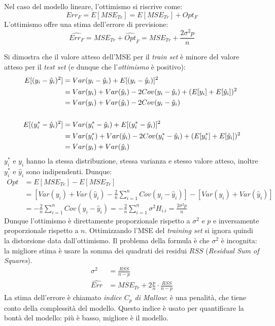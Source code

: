 \documentclass[12pt, a4page]{article}
\begin{document}
Nel caso del modello lineare, l'ottimismo si riscrive come:
\begin{equation*}
  Err_F = E[MSE_{Te}] = E[MSE_{Tr}] + Opt_F
\end{equation*}
L'ottimismo offre una stima dell'errore di previsione:
\begin{equation*}
  \hat{Err_F} = MSE_{Tr} + \hat{Opt}_F = MSE_{Tr} + \frac{2\sigma^2 p}{n}
\end{equation*}

Si dimostra che il valore atteso dell'MSE per il \textit{train set} è minore del valore atteso per il \textit{test set} (e dunque che l'\textit{ottimismo} è positivo):
\begin{align*}
  E[(y_i - \hat{y}_i)^2] &= Var(y_i - \hat{y}_i) + E[(y_i - \hat{y}_i)]^2 \\
                         &= Var(y_i) + Var(\hat{y}_i) - 2Cov(y_i - \hat{y}_i) + (E[y_i] + E[\hat{y}_i])^2 \\
  &= Var(y_i) + Var(\hat{y}_i) - 2Cov(y_i - \hat{y}_i) \\
  \vspace{5pt} \\
  E[(y_i^* - \hat{y}_i)^2] &= Var(y_i^* - \hat{y}_i) + E[(y_i^* - \hat{y}_i)]^2 \\
                         &= Var(y_i^*) + Var(\hat{y}_i) - 2Cov(y_i^* - \hat{y}_i) + (E[y_i^*] + E[\hat{y}_i])^2 \\
                         &= Var(y_i) + Var(\hat{y}_i)
\end{align*}
$y_i^*$ e $y_i$ hanno la stessa distribuzione, stessa varianza e stesso valore atteso, inoltre $y_i^*$ e $\hat{y}_i$ sono indipendenti.
Dunque:
\begin{align*}
  Opt &= E[MSE_{Te}] - E[MSE_{Tr}] \\
                         &= [Var(y_i) + Var(\hat{y}_i) - \frac{2}{n}\sum_{i=1}^n Cov(y_i - \hat{y}_i)] - [Var(y_i) + Var(\hat{y}_i)] \\
                         &= - \frac{2}{n}\sum_{i=1}^n Cov(y_i - \hat{y}_i)
                           = - \frac{2}{n}\sum_{i=1}^n \sigma^2H_{i.i}
                           = \frac{2\sigma^2 p}{n}
\end{align*}
Dunque l'ottimismo è direttamente proporzionale rispetto a $\sigma^2$ e $p$ e inversamente proporzionale rispetto a $n$.
Ottimizzando l'MSE del \textit{training set} si ignora quindi la distorsione data dall'ottimismo.
Il problema della formula è che $\sigma^2$ è incognita: la migliore stima è usare la somma dei quadrati dei residui $RSS$ (\textit{Residual Sum of Squares}).
\begin{align*}
  \sigma^2 &= \frac{RSS}{n - p} \\
  \hat{Err} &= MSE_{Tr} + 2\frac{p}{n} \cdot \frac{RSS}{n - p}
\end{align*}
La stima dell'errore è chiamato \textit{indice $C_p$ di Mallow}: è una penalità, che tiene conto della complessità del modello.
Questo indice è usato per quantificare la bontà del modello: più è basso, migliore è il modello.
\end{document}
